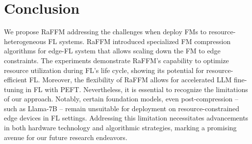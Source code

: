 
\section{Conclusion}
We propose RaFFM addressing the challenges when deploy FMs to resource-heterogeneous FL systems. RaFFM introduced specialized FM compression algorithms for edge-FL system that allows scaling down the FM to edge constraints. The experiments demonstrate RaFFM's capability to optimize resource utilization during FL's life cycle, showing its potential for resource-efficient FL. 
Moreover, the flexibility of RaFFM allows for accelerated LLM fine-tuning in FL with PEFT. Nevertheless, it is essential to recognize the limitations of our approach. Notably, certain foundation models, even post-compression – such as Llama-7B – remain unsuitable for deployment on resource-constrained edge devices in FL settings. Addressing this limitation necessitates advancements in both hardware technology and algorithmic strategies, marking a promising avenue for our future research endeavors.